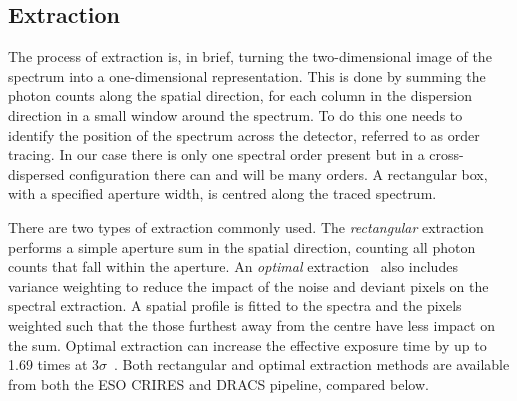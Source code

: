 \subsection{Extraction}
\label{subsec:extraction}
The process of extraction is, in brief, turning the two-dimensional image of the spectrum into a one-dimensional representation.
This is done by summing the photon counts along the spatial direction, for each column in the dispersion direction in a small window around the spectrum.
To do this one needs to identify the position of the spectrum across the detector, referred to as {order tracing}.
In our case there is only one spectral order present but in a cross-dispersed configuration there can and will be many orders.
A rectangular box, with a specified aperture width, is centred along the traced spectrum.

There are two types of extraction commonly used.
The \emph{rectangular} extraction performs a simple aperture sum in the spatial direction, counting all photon counts that fall within the aperture.
An \emph{optimal} extraction~\citep{horne_optimal_1986} also includes variance weighting to reduce the impact of the noise and deviant pixels on the spectral extraction.
A spatial profile is fitted to the spectra and the pixels weighted such that the those furthest away from the centre have less impact on the sum.
Optimal extraction can increase the effective exposure time by up to 1.69 times at \(3 \sigma\)~\citep{horne_optimal_1986}.
Both rectangular and optimal extraction methods are available from both the {ESO} {CRIRES} and {DRACS} pipeline, compared below.








